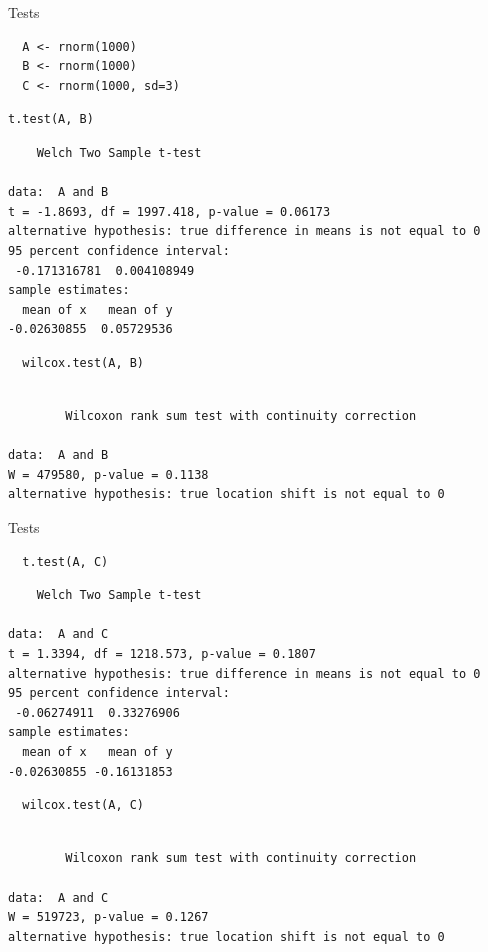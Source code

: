 \documentclass[xcolor={usenames,svgnames,dvipsnames}]{beamer}
\begin{document}
\begin{frame}[fragile,label=sec-2-6]{Tests}
 \lstset{language=R,label= ,caption= ,numbers=none}
\begin{lstlisting}
  A <- rnorm(1000)
  B <- rnorm(1000)
  C <- rnorm(1000, sd=3)
\end{lstlisting}

\lstset{language=R,label= ,caption= ,numbers=none}
\begin{lstlisting}
t.test(A, B)
\end{lstlisting}

\begin{verbatim}
	Welch Two Sample t-test

data:  A and B
t = -1.8693, df = 1997.418, p-value = 0.06173
alternative hypothesis: true difference in means is not equal to 0
95 percent confidence interval:
 -0.171316781  0.004108949
sample estimates:
  mean of x   mean of y 
-0.02630855  0.05729536
\end{verbatim}

\lstset{language=R,label= ,caption= ,numbers=none}
\begin{lstlisting}
  wilcox.test(A, B)
\end{lstlisting}

\begin{verbatim}

        Wilcoxon rank sum test with continuity correction

data:  A and B
W = 479580, p-value = 0.1138
alternative hypothesis: true location shift is not equal to 0
\end{verbatim}
\end{frame}


\begin{frame}[fragile,label=sec-2-7]{Tests}
 \lstset{language=R,label= ,caption= ,numbers=none}
\begin{lstlisting}
  t.test(A, C)
\end{lstlisting}

\begin{verbatim}
	Welch Two Sample t-test

data:  A and C
t = 1.3394, df = 1218.573, p-value = 0.1807
alternative hypothesis: true difference in means is not equal to 0
95 percent confidence interval:
 -0.06274911  0.33276906
sample estimates:
  mean of x   mean of y 
-0.02630855 -0.16131853
\end{verbatim}

\lstset{language=R,label= ,caption= ,numbers=none}
\begin{lstlisting}
  wilcox.test(A, C)
\end{lstlisting}

\begin{verbatim}

        Wilcoxon rank sum test with continuity correction

data:  A and C
W = 519723, p-value = 0.1267
alternative hypothesis: true location shift is not equal to 0
\end{verbatim}
\end{frame}
\end{document}
